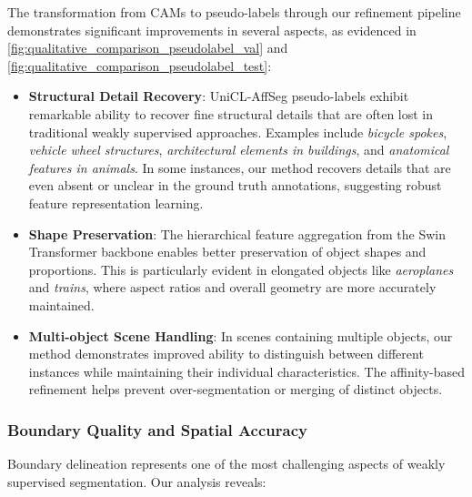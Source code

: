 The transformation from CAMs to pseudo-labels through our refinement pipeline demonstrates significant improvements in several aspects, as evidenced in \autoref{fig:qualitative_comparison_pseudolabel_val} and \autoref{fig:qualitative_comparison_pseudolabel_test}:

\begin{itemize}
    \item \textbf{Structural Detail Recovery}: UniCL-AffSeg pseudo-labels exhibit remarkable ability to recover fine structural details that are often lost in traditional weakly supervised approaches. Examples include \textit{bicycle spokes}, \textit{vehicle wheel structures}, \textit{architectural elements in buildings}, and \textit{anatomical features in animals}. In some instances, our method recovers details that are even absent or unclear in the ground truth annotations, suggesting robust feature representation learning.
    
    \item \textbf{Shape Preservation}: The hierarchical feature aggregation from the Swin Transformer backbone enables better preservation of object shapes and proportions. This is particularly evident in elongated objects like \textit{aeroplanes} and \textit{trains}, where aspect ratios and overall geometry are more accurately maintained.
    
    \item \textbf{Multi-object Scene Handling}: In scenes containing multiple objects, our method demonstrates improved ability to distinguish between different instances while maintaining their individual characteristics. The affinity-based refinement helps prevent over-segmentation or merging of distinct objects.
\end{itemize}

\subsubsection{Boundary Quality and Spatial Accuracy}
\label{subsubsec:boundary_quality}

Boundary delineation represents one of the most challenging aspects of weakly supervised segmentation. Our analysis reveals:


